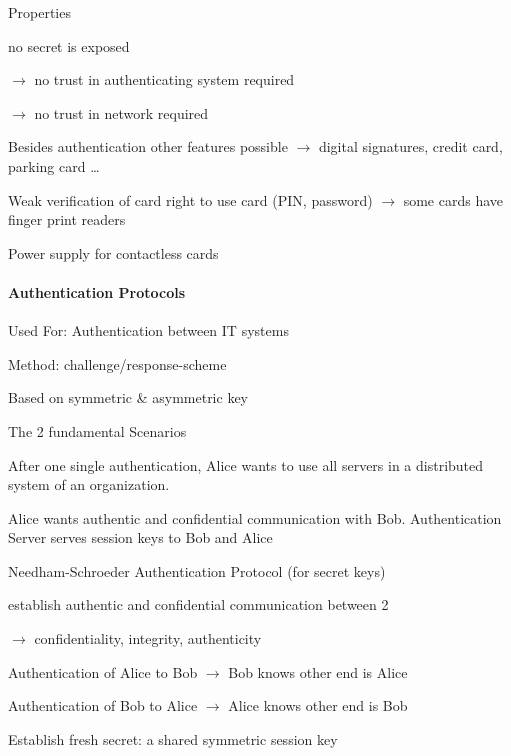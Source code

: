 \documentclass[a4paper]{article}
\begin{document}
\begin{multicols}{3}
    Properties
    \begin{itemize*}
        \item no secret is exposed
        \begin{itemize*}
            \item[$\rightarrow$] no trust in authenticating system required
            \item[$\rightarrow$] no trust in network required
        \end{itemize*}
        \item Besides authentication other features possible $\rightarrow$ digital signatures, credit card, parking card \dots
        \item Weak verification of card right to use card (PIN, password) $\rightarrow$ some cards have finger print readers
        \item Power supply for contactless cards
    \end{itemize*}

    \paragraph{Authentication Protocols}
    \begin{itemize*}
        \item Used For: Authentication between IT systems
        \item Method: challenge/response-scheme
        \item Based on symmetric \& asymmetric key
    \end{itemize*}
    The 2 fundamental Scenarios
    \begin{enumerate*}
        \item After one single authentication, Alice wants to use all servers in a distributed system of an organization.
        \item Alice wants authentic and confidential communication with Bob. Authentication Server serves session keys to Bob and Alice
    \end{enumerate*}

    Needham-Schroeder Authentication Protocol (for secret keys)
    \begin{itemize*}
        \item establish authentic and confidential communication between 2
        \item[$\rightarrow$] confidentiality, integrity, authenticity
    \end{itemize*}
    \begin{enumerate*}
        \item Authentication of Alice to Bob $\rightarrow$ Bob knows other end is Alice
        \item Authentication of Bob to Alice $\rightarrow$ Alice knows other end is Bob
        \item Establish fresh secret: a shared symmetric session key
    \end{enumerate*}


\end{multicols}
\end{document}
